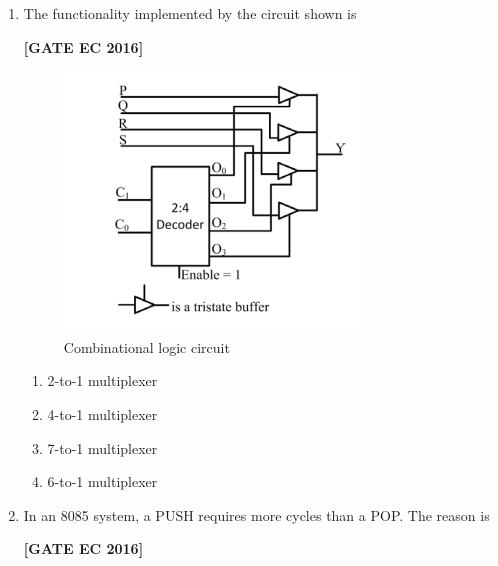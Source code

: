 \documentclass[12pt]{article}
\begin{document}
\begin{enumerate}[label=\textbf{Q.\arabic*.}, start=6, itemsep=2em]
\begin{enumerate}[label=\textbf{Q.\arabic*.}, start=26]
\begin{enumerate}[label=\textbf{Q.\arabic*.}, start=31]
\begin{multicols}{2}
    \begin{enumerate}
        \item Binary to Gray code converter
        \item Binary to XS-3 converter
        \item Gray to Binary converter
        \item XS-3 to Binary converter
    \end{enumerate}
\end{multicols}

\item The functionality implemented by the circuit shown is

\noindent \textbf{[GATE EC 2016]}

\begin{figure}[H]\centering
\includegraphics[width=0.55\columnwidth]{figs/q43.png}
\caption{Combinational logic circuit}
\label{fig:q43}
\end{figure}

\begin{multicols}{2}
    \begin{enumerate}
        \item 2-to-1 multiplexer
        \item 4-to-1 multiplexer
        \item 7-to-1 multiplexer
        \item 6-to-1 multiplexer
    \end{enumerate}
\end{multicols}

\item In an 8085 system, a PUSH requires more cycles than a POP. The reason is

\noindent \textbf{[GATE EC 2016]}


\end{enumerate}
\end{enumerate}
\end{enumerate}
\end{document}
